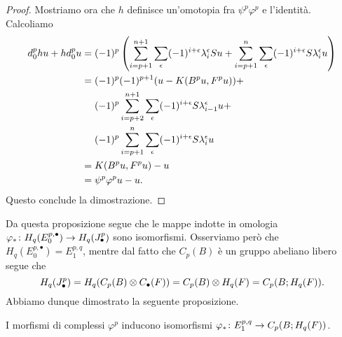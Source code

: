\begin{proof}
Mostriamo ora che \(h\) definisce un'omotopia fra \(\psi^p\varphi^p\) e l'identità. Calcoliamo
\begin{align*}
d^p_0hu+hd^p_0u&=(-1)^p\left(\sum_{i=p+1}^{n+1}\sum_\epsilon(-1)^{i+\epsilon}\lambda^\epsilon_iSu+\sum_{i=p+1}^n\sum_\epsilon(-1)^{i+\epsilon}S\lambda^\epsilon_iu\right)\\
&=(-1)^p(-1)^{p+1}(u-K(B^pu,F^pu))+\\
&\phantomop(-1)^p\sum_{i=p+2}^{n+1}\sum_\epsilon(-1)^{i+\epsilon}S\lambda^\epsilon_{i-1}u+\\
&\phantomop(-1)^p\sum_{i=p+1}^n\sum_\epsilon(-1)^{i+\epsilon}S\lambda^\epsilon_iu\\
&=K(B^pu,F^pu)-u\\
&=\psi^p\varphi^pu-u.
\end{align*}
Questo conclude la dimostrazione.
\end{proof}

Da questa proposizione segue che le mappe indotte in omologia \(\map{\varphi_*}{H_q(E^{p,\bullet}_0)}{H_q(J^p_\bullet)}\) sono isomorfismi. Osserviamo però che \(H_q(E^{p,\bullet}_0)=E^{p,q}_1\), mentre dal fatto che \(C_p(B)\) è un gruppo abeliano libero segue che
\[
H_q(J^p_\bullet)=H_q(C_p(B)\mathbin{\otimes} C_\bullet(F))=C_p(B)\mathbin{\otimes} H_q(F)=C_p(B;H_q(F)).
\]
Abbiamo dunque dimostrato la seguente proposizione.
\begin{proposition}
I morfismi di complessi \(\varphi^p\) inducono isomorfismi \(\map{\varphi_*}{E^{p,q}_1}{C_p(B;H_q(F))}\).
\end{proposition}

